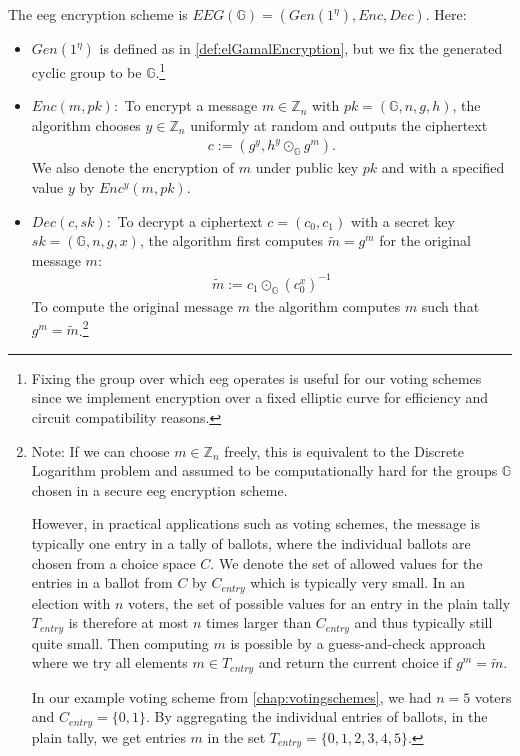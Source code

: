\begin{definition}
    \label{def:eeg}
    The \gls{eeg} encryption scheme is $EEG(\mathbb{G})=(Gen(1^\eta), Enc, Dec)$. 
    Here:
    \begin{itemize}
        \item $Gen(1^\eta)$ is defined as in \cref{def:elGamalEncryption}, but we fix the generated cyclic group to be $\mathbb{G}$.\footnote{
            \label{footnote:fixedGeneratedGroup}
            Fixing the group over which \gls{eeg} operates is useful for our voting schemes since we implement encryption over a fixed elliptic curve for efficiency and circuit compatibility reasons.
        }
        \item $Enc(m, pk):$ To encrypt a message $m\in \mathbb{Z}_n$ with $pk=(\mathbb{G}, n, g, h)$, the algorithm chooses $y\in\mathbb{Z}_n$ uniformly at random and outputs the ciphertext
        \begin{align*}
            c:=(g^y, h^y\odot_{\mathbb{G}} g^m)\text{.}
        \end{align*}
        We also denote the encryption of $m$ under public key $pk$ and with a specified value $y$ by $Enc^{y}(m, pk)$.
        \item $Dec(c, sk):$ To decrypt a ciphertext $c=(c_0, c_1)$ with a secret key $sk=(\mathbb{G}, n, g, x)$, the algorithm first computes $\tilde{m}=g^m$ for the original message $m$: \begin{align*}
            \tilde{m}:=c_1\odot_{\mathbb{G}} (c_0^x)^{-1}
        \end{align*}
        To compute the original message $m$ the algorithm computes $m$ such that $g^m=\tilde{m}$.\footnote{\label{footnote:eegDiscreteLogProblem}
            Note: If we can choose $m\in\mathbb{Z}_n$ freely, this is equivalent to the Discrete Logarithm problem and assumed to be computationally hard for the groups $\mathbb{G}$ chosen in a secure \gls{eeg} encryption scheme.

            However, in practical applications such as voting schemes, the message is typically one entry in a tally of ballots, where the individual ballots are chosen from a choice space $C$.
            We denote the set of allowed values for the entries in a ballot from $C$ by $C_{entry}$ which is typically very small. 
            In an election with $n$ voters, the set of possible values for an entry in the plain tally $T_{entry}$ is therefore at most $n$ times larger than $C_{entry}$ and thus typically still quite small.
            Then computing $m$ is possible by a guess-and-check approach where we try all elements $m\in T_{entry}$ and return the current choice if $g^m=\tilde{m}$.
            
            In our example voting scheme from \cref{chap:votingschemes}, we had $n=5$ voters and $C_{entry}=\{0,1\}$.
            By aggregating the individual entries of ballots, in the plain tally, we get entries $m$ in the set $T_{entry}=\{0,1,2,3,4,5\}$.
        }
    \end{itemize}
\end{definition}

